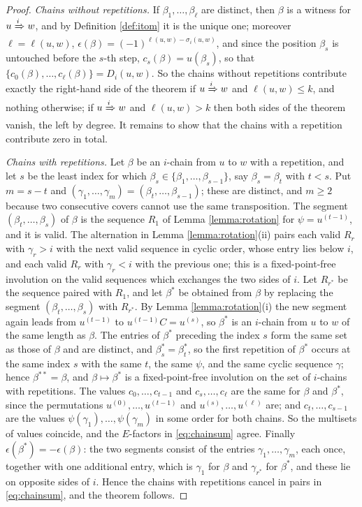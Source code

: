 \documentclass{amsart}
\theoremstyle{definition}
\theoremstyle{remark}
\numberwithin{equation}{section}
\begin{document}
\begin{proof}
\emph{Chains without repetitions.} If $\beta_1,\ldots,\beta_\ell$ are distinct, then $\beta$ is a witness for $u\xRightarrow{i}w$, and by Definition \ref{def:itom} it is the unique one; moreover $\ell=\ell(u,w)$, $\epsilon(\beta)=(-1)^{\ell(u,w)-\sigma_i(u,w)}$, and since the position $\beta_s$ is untouched before the $s$-th step, $c_s(\beta)=u(\beta_s)$, so that $\{c_0(\beta),\ldots,c_\ell(\beta)\}=D_i(u,w)$. So the chains without repetitions contribute exactly the right-hand side of the theorem if $u\xRightarrow{i}w$ and $\ell(u,w)\leq k$, and nothing otherwise; if $u\xRightarrow{i}w$ and $\ell(u,w)>k$ then both sides of the theorem vanish, the left by degree. It remains to show that the chains with a repetition contribute zero in total.

\emph{Chains with repetitions.} Let $\beta$ be an $i$-chain from $u$ to $w$ with a repetition, and let $s$ be the least index for which $\beta_s\in\{\beta_1,\ldots,\beta_{s-1}\}$, say $\beta_s=\beta_t$ with $t<s$. Put $m=s-t$ and $(\gamma_1,\ldots,\gamma_m)=(\beta_t,\ldots,\beta_{s-1})$; these are distinct, and $m\geq2$ because two consecutive covers cannot use the same transposition. The segment $(\beta_t,\ldots,\beta_s)$ of $\beta$ is the sequence $R_1$ of Lemma \ref{lemma:rotation} for $\psi=u^{(t-1)}$, and it is valid. The alternation in Lemma \ref{lemma:rotation}(ii) pairs each valid $R_r$ with $\gamma_r>i$ with the next valid sequence in cyclic order, whose entry lies below $i$, and each valid $R_r$ with $\gamma_r<i$ with the previous one; this is a fixed-point-free involution on the valid sequences which exchanges the two sides of $i$. Let $R_{r^*}$ be the sequence paired with $R_1$, and let $\beta^*$ be obtained from $\beta$ by replacing the segment $(\beta_t,\ldots,\beta_s)$ with $R_{r^*}$. By Lemma \ref{lemma:rotation}(i) the new segment again leads from $u^{(t-1)}$ to $u^{(t-1)}C=u^{(s)}$, so $\beta^*$ is an $i$-chain from $u$ to $w$ of the same length as $\beta$. The entries of $\beta^*$ preceding the index $s$ form the same set as those of $\beta$ and are distinct, and $\beta^*_s=\beta^*_t$, so the first repetition of $\beta^*$ occurs at the same index $s$ with the same $t$, the same $\psi$, and the same cyclic sequence $\gamma$; hence $\beta^{**}=\beta$, and $\beta\mapsto\beta^*$ is a fixed-point-free involution on the set of $i$-chains with repetitions. The values $c_0,\ldots,c_{t-1}$ and $c_s,\ldots,c_\ell$ are the same for $\beta$ and $\beta^*$, since the permutations $u^{(0)},\ldots,u^{(t-1)}$ and $u^{(s)},\ldots,u^{(\ell)}$ are; and $c_t,\ldots,c_{s-1}$ are the values $\psi(\gamma_1),\ldots,\psi(\gamma_m)$ in some order for both chains. So the multisets of values coincide, and the $E$-factors in \eqref{eq:chainsum} agree. Finally $\epsilon(\beta^*)=-\epsilon(\beta)$: the two segments consist of the entries $\gamma_1,\ldots,\gamma_m$, each once, together with one additional entry, which is $\gamma_1$ for $\beta$ and $\gamma_{r^*}$ for $\beta^*$, and these lie on opposite sides of $i$. Hence the chains with repetitions cancel in pairs in \eqref{eq:chainsum}, and the theorem follows.
\end{proof}
\end{document}
